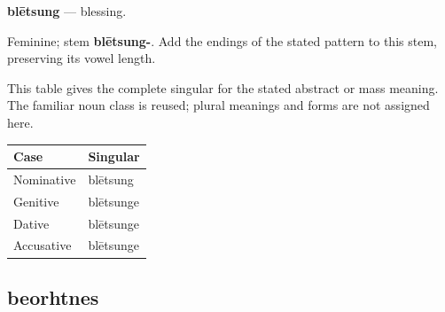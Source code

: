 \par\begin{minipage}{\linewidth}\raggedright
\textbf{blētsung} — blessing.

Feminine; stem \textbf{blētsung-}. Add the endings of the stated pattern to this stem, preserving its vowel length.

This table gives the complete singular for the stated abstract or mass meaning. The familiar noun class is reused; plural meanings and forms are not assigned here.

\par\begingroup
\fontsize{10.5}{13.2}\selectfont
\setlength{\LTleft}{0pt}\setlength{\LTright}{\fill}
\noindent
\begin{tabular}{@{}>{\raggedright\arraybackslash}p{60.59mm}>{\raggedright\arraybackslash}p{60.59mm}@{}}
\toprule
\textbf{Case} & \textbf{Singular} \\
\midrule
Nominative & blētsung \\
Genitive & blētsunge \\
Dative & blētsunge \\
Accusative & blētsunge \\
\bottomrule
\end{tabular}
\par\endgroup

\end{minipage}\par
{}
\subsection*{beorhtnes}

